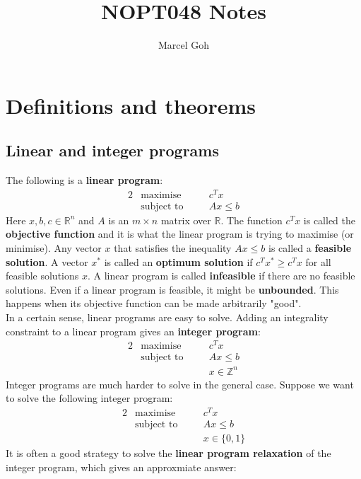 \documentclass[12pt]{article}
\newcommand{\Z}{\mathbb{Z}}
\newcommand{\R}{\mathbb{R}}
\theoremstyle{plain}
\begin{document}
\title{NOPT048 Notes}
\author{Marcel Goh}
\maketitle

\section{Definitions and theorems}
\subsection{Linear and integer programs}
The following is a \textbf{linear program}:
\begin{alignat*}{2}
    & \text{maximise} & \quad & c^Tx \\
    & \text{subject to} & & Ax \leq b
\end{alignat*}
Here $x, b, c\in \R^n$ and $A$ is an $m\times n$ matrix over $\R$. The function $c^Tx$ is called the \textbf{objective function} and it is what the linear program is trying to maximise (or minimise). Any vector $x$ that satisfies the inequality $Ax \leq b$ is called a \textbf{feasible solution}. A vector $x^*$ is called an \textbf{optimum solution} if $c^Tx^* \geq c^Tx$ for all feasible solutions $x$. A linear program is called \textbf{infeasible} if there are no feasible solutions. Even if a linear program is feasible, it might be \textbf{unbounded}. This happens when its objective function can be made arbitrarily "good".\\
\indent In a certain sense, linear programs are easy to solve. Adding an integrality constraint to a linear program gives an \textbf{integer program}:
\begin{alignat*}{2}
    & \text{maximise} & \quad & c^Tx \\
    & \text{subject to} & & Ax \leq b\\
    &                   & & x \in \Z^n
\end{alignat*}
Integer programs are much harder to solve in the general case. Suppose we want to solve the following integer program:
\begin{alignat*}{2}
    & \text{maximise} & \quad & c^Tx \\
    & \text{subject to} & & Ax \leq b\\
    &                   & & x \in \{0,1\}
\end{alignat*}
It is often a good strategy to solve the \textbf{linear program relaxation} of the integer program, which gives an approxmiate answer:
\end{document}

